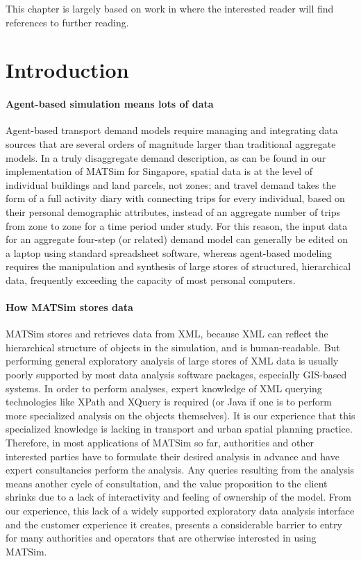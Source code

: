 This chapter is largely based on work in \citet[][]{ErathEtAl_EASTS_2013} where the interested reader will find references to further reading.
\section{Introduction}
\label{sec:analyticsIntro}
\paragraph{Agent-based simulation means lots of data}
Agent-based transport demand models require managing and integrating data sources that are several orders of magnitude larger than traditional aggregate models. In a truly disaggregate demand description, as can be found in our implementation of MATSim for Singapore, spatial data is at the level of individual buildings and land parcels, not zones; and travel demand takes the form of a full activity diary with connecting trips for every individual, based on their personal demographic attributes, instead of an aggregate number of trips from zone to zone for a time period under study. For this reason, the input data for an aggregate four-step (or related) demand model can generally be edited on a laptop using standard spreadsheet software, whereas agent-based modeling requires the manipulation and synthesis of large stores of structured, hierarchical data, frequently exceeding the capacity of most personal computers.

\paragraph{How MATSim stores data}
MATSim stores and retrieves data from XML, because XML can reflect the hierarchical structure of objects in the simulation, and is human-readable. But performing general exploratory analysis of large stores of XML data is usually poorly supported by most data analysis software packages, especially GIS-based systems. In order to perform analyses, expert knowledge of XML querying technologies like XPath and XQuery is required (or Java if one is to perform more specialized analysis on the objects themselves).  It is our experience that this specialized knowledge is lacking in transport and urban spatial planning practice. Therefore, in most applications of MATSim so far, authorities and other interested parties have to formulate their desired analysis in advance and have expert consultancies perform the analysis. Any queries resulting from the analysis means another cycle of consultation, and the value proposition to the client shrinks due to a lack of interactivity and feeling of ownership of the model. From our experience, this lack of a widely supported exploratory data analysis interface and the customer experience it creates, presents a considerable barrier to entry for many authorities and operators that are otherwise interested in using MATSim.

